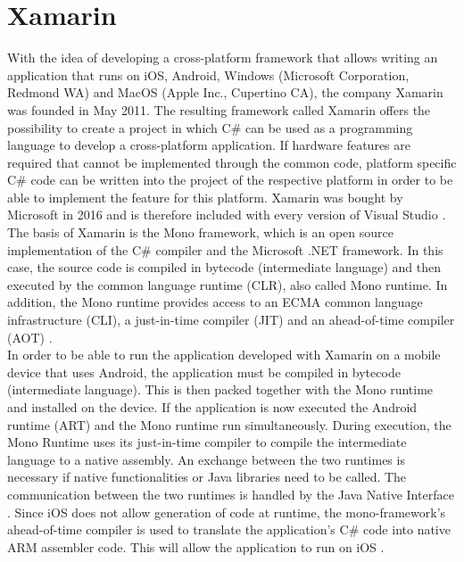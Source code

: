 \documentclass[Bachelor,BIF,english]{twbook}
\begin{document}
\section{Xamarin}
With the idea of developing a cross-platform framework that allows writing an application that runs on iOS, Android, Windows (Microsoft Corporation, Redmond WA) and MacOS (Apple Inc., Cupertino CA), the company Xamarin was founded in May 2011. The resulting framework called Xamarin offers the possibility to create a project in which C\# can be used as a programming language to develop a cross-platform application. If hardware features are required that cannot be implemented through the common code, platform specific C\# code can be written into the project of the respective platform in order to be able to implement the feature for this platform. Xamarin was bought by Microsoft in 2016 and is therefore included with every version of Visual Studio \cite[p.~14]{ZubaBernhard2017EdPb} \cite[p.~16]{LinckArne2016}.
\\[\baselineskip]
The basis of Xamarin is the Mono framework, which is an open source implementation of the C\# compiler and the Microsoft .NET framework. In this case, the source code is compiled in bytecode (intermediate language) and then executed by the common language runtime (CLR), also called Mono runtime. In addition, the Mono runtime provides access to an ECMA common language infrastructure (CLI), a just-in-time compiler (JIT) and an ahead-of-time compiler (AOT) \cite[p.~14]{ZubaBernhard2017EdPb}.
\\[\baselineskip]
In order to be able to run the application developed with Xamarin on a mobile device that uses Android, the application must be compiled in bytecode (intermediate language). This is then packed together with the Mono runtime and installed on the device. If the application is now executed the Android runtime (ART) and the Mono runtime run simultaneously. During execution, the Mono Runtime uses its just-in-time compiler to compile the intermediate language to a native assembly. An exchange between the two runtimes is necessary if native functionalities or Java libraries need to be called. The communication between the two runtimes is handled by the Java Native Interface \cite[p.~14-15]{ZubaBernhard2017EdPb} \cite[p.~456]{WillocxVossaertNaessens2015}. Since iOS does not allow generation of code at runtime, the mono-framework's ahead-of-time compiler is used to translate the application's C\# code into native ARM assembler code. This will allow the application to run on iOS\cite[p.~15]{ZubaBernhard2017EdPb} \cite[p.~456]{WillocxVossaertNaessens2015}.
\end{document}
